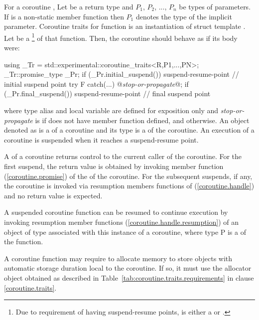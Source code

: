 \pnum
For a coroutine , Let  be a return type and $P_1$, $P_2$, ..., $P_n$
be types of parameters. If  is a non-static member function then $P_1$ denotes the type of the implicit  parameter. 
Coroutine traits for function  is an instantiation of
struct template .
Let  be a 
\footnote{
Due to requirement of having suspend-resume points,
 is either a
 or 
.
}
of that function. Then, the coroutine 
should behave as if its body were:
\begin{codeblock}
  {
     using _Tr = std::experimental::coroutine_traits<R,P1,...,PN>;
     _Tr::promise_type _Pr;
     if (_Pr.initial_suspend()) {
       suspend-resume-point // initial suspend point
     }
     try { F }
     catch(...) {
       @\textit{stop-or-propagate}@;
     }
     if (_Pr.final_suspend()) {
       suspend-resume-point // final suspend point
     }
  }
\end{codeblock}
where type alias  and local variable  are 
defined for
exposition only and
\textit{stop-or-propagate} is  
if  does not have  member function defined, and  otherwise. An object denoted as  is a  of
a coroutine and its type is a 
of the coroutine.
An execution of a coroutine is suspended when it reaches a suspend-resume point.

\pnum 
A  of a coroutine returns control to the current
caller of the coroutine. For the first suspend, the return value is obtained by invoking member function 
 (\ref{coroutine.promise})
of the  of the coroutine.
For the subsequent suspends, if any, the coroutine
is invoked via resumption members functions of
 (\ref{coroutine.handle}) and no return value is expected.

\pnum
A suspended coroutine function can be resumed
to continue execution by invoking
resumption member functions (\ref{coroutine.handle.resumption}) of an object of  type
associated with this instance of a coroutine, where type P
is a  of the function. 

\pnum
A coroutine function may require to allocate
memory to store objects with automatic storage duration
local to the coroutine. If so, it must
use the allocator object obtained as described in 
Table~\ref{tab:coroutine.traits.requirements} in clause \ref{coroutine.traits}.

